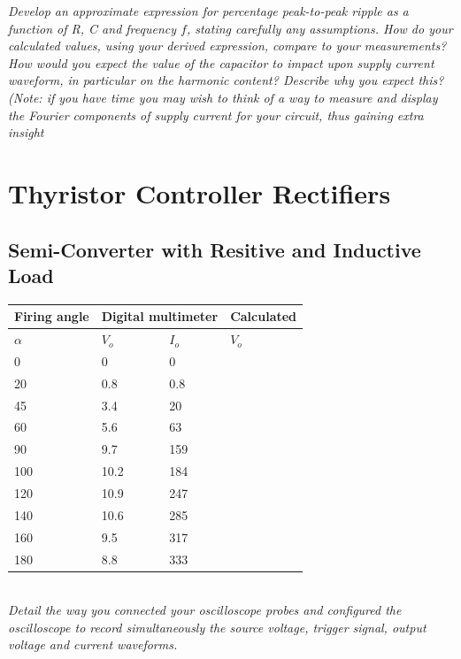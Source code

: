 \documentclass[12pt,a4paper]{article}
\begin{document}
\textit{Develop an approximate expression for percentage peak-to-peak ripple as a function of R, C and
frequency $f$, stating carefully any assumptions. How do your calculated values, using your derived
expression, compare to your measurements?}\\

\textit{How would you expect the value of the capacitor to impact upon supply current waveform, in
particular on the harmonic content? Describe why you expect this?
(Note: if you have time you may wish to think of a way to measure and display the Fourier
components of supply current for your circuit, thus gaining extra insight}\\
\section{Thyristor Controller Rectifiers}
\subsection{Semi-Converter with Resitive and Inductive Load}
\begin{center}
\begin{tabular}{|p{3cm}|p{2.5cm}|p{2.5cm}|p{2.5cm}|}
\hline
\centering\textbf{Firing angle} &
\multicolumn{2}{c|}{\textbf{Digital multimeter}} &
\centering\textbf{Calculated} \tabularnewline
\hline
\centering$\alpha$ & \centering$V_o$ & \centering$I_o$ & \centering$V_o$ \tabularnewline
\hline
0 & 0 & 0 & \\ \hline
20 & 0.8 & 0.8 & \\ \hline
45 & 3.4 & 20 & \\ \hline
60 & 5.6 & 63 & \\ \hline
90 & 9.7 & 159 & \\ \hline
100 & 10.2 & 184 & \\ \hline
120 & 10.9 & 247 & \\ \hline
140 & 10.6 & 285 & \\ \hline
160 & 9.5 & 317 & \\ \hline
180 & 8.8 & 333 & \\ \hline
\end{tabular}
\end{center}\\
\textit{Detail the way you connected your oscilloscope probes and configured the oscilloscope to record simultaneously the source voltage, trigger signal, output voltage and current waveforms.}\\\\
\end{document}
